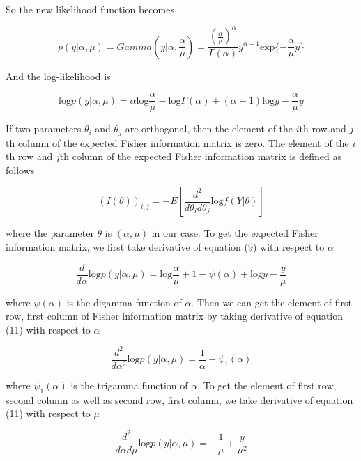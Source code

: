 \documentclass[12pt]{article}
\begin{document}
So the new likelihood function becomes

\begin{equation*}
p(y|\alpha,\mu) = Gamma(y|\alpha,\frac{\alpha}{\mu}) = \frac{(\frac{\alpha}{\mu})^{\alpha}}{\Gamma(\alpha)}y^{\alpha-1}\text{exp}\{ -\frac{\alpha}{\mu} y \}
\end{equation*}

And the log-likelihood is

\begin{equation}
\text{log}p(y|\alpha,\mu) = \alpha \text{log}\frac{\alpha}{\mu}-\text{log}\Gamma(\alpha)+(\alpha-1)\text{log}y-\frac{\alpha}{\mu}y
\end{equation}

If two parameters $\theta_i$ and $\theta_j$ are orthogonal, then the element of the $i$th row and $j$th column of the expected Fisher information matrix is zero. The element of the $i$th row and $j$th column of the expected Fisher information matrix is defined as follows

\begin{equation}
(I(\theta))_{i,j} = - E \left[ \frac{d^2}{d\theta_i d\theta_j}\text{log}f(Y|\theta) \right]
\end{equation}

where the parameter $\theta$ is $(\alpha, \mu)$ in our case. To get the expected Fisher information matrix, we first take derivative of equation (9) with respect to $\alpha$

\begin{equation}
\frac{d}{d\alpha}\text{log}p(y|\alpha,\mu)=\text{log}\frac{\alpha}{\mu}+1-\psi(\alpha)+\text{log}y-\frac{y}{\mu}
\end{equation}

where $\psi(\alpha)$ is the digamma function of $\alpha$. Then we can get the element of first row, first column of Fisher information matrix by taking derivative of equation (11) with respect to $\alpha$

\begin{equation}
\frac{d^2}{d\alpha^2}\text{log}p(y|\alpha,\mu)=\frac{1}{\alpha}-\psi_1(\alpha)
\end{equation}

where $\psi_1(\alpha)$ is the trigamma function of $\alpha$. To get the element of first row, second column as well as second row, first column, we take derivative of equation (11) with respect to $\mu$

\begin{equation}
\frac{d^2}{d\alpha d\mu}\text{log}p(y|\alpha,\mu)=-\frac{1}{\mu}+\frac{y}{\mu^2}
\end{equation}
\end{document}
